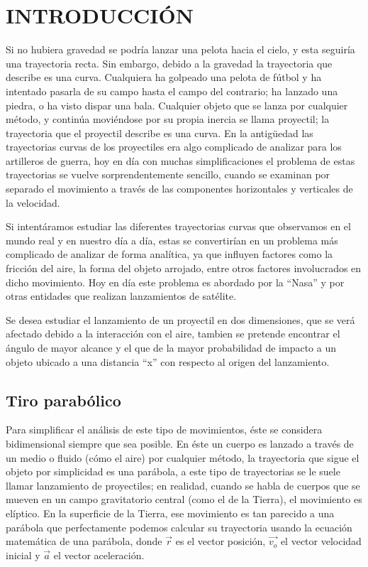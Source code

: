 \documentclass[11pt,letterpaper,twocolumn]{article}
\begin{document}
\section*{\normalsize{INTRODUCCIÓN}} 
Si no hubiera gravedad se podría lanzar una pelota hacia el cielo, y esta seguiría una trayectoria recta. Sin embargo, debido a la gravedad la trayectoria que describe es una curva. Cualquiera ha golpeado una pelota de fútbol y ha intentado pasarla de su campo hasta el campo del contrario; ha lanzado una piedra, o ha visto dispar una bala. Cualquier objeto que se lanza por cualquier método, y continúa moviéndose por su propia inercia se llama proyectil; la trayectoria que el proyectil describe es una curva. En la antigüedad las trayectorias curvas de los proyectiles era algo complicado de analizar para los artilleros de guerra, hoy en día con muchas simplificaciones el problema de estas trayectorias se vuelve sorprendentemente sencillo, cuando se examinan por separado el movimiento a través de las componentes horizontales  y verticales de la velocidad.\\
\par
Si intentáramos estudiar las diferentes trayectorias curvas que observamos en el mundo real y en nuestro día a día, estas se convertirían en un problema más complicado de analizar de forma analítica, ya que influyen factores como la fricción del aire, la forma del objeto arrojado, entre otros factores involucrados en dicho movimiento. Hoy en día este problema es abordado por la “Nasa” y por otras entidades que realizan lanzamientos de satélite.
\par 
Se desea estudiar el lanzamiento de un proyectil en dos dimensiones, que se verá afectado debido a la interacción con el aire, tambien se pretende encontrar el ángulo de mayor alcance y el que de la mayor probabilidad de impacto a un objeto ubicado a una distancia “x” con respecto al origen del lanzamiento. 
\subsection*{Tiro parabólico }
Para simplificar el análisis de este tipo de movimientos, éste se considera bidimensional siempre que sea posible. En éste un cuerpo es lanzado a través de un medio o fluido (cómo el aire) por cualquier método, la trayectoria que sigue el objeto por simplicidad es una parábola, a este tipo de trayectorias se le suele llamar lanzamiento de proyectiles; en realidad, cuando se habla de cuerpos que se mueven en un campo gravitatorio central (como el de la Tierra), el movimiento es elíptico. En la superficie de la Tierra, ese movimiento es tan parecido a una parábola que perfectamente podemos calcular su trayectoria usando la ecuación matemática de una parábola, donde $\vec{r}$ es el vector posición, $\vec{v_{o}}$ el vector velocidad inicial y $\vec{a}$ el vector aceleración.
\end{document}
